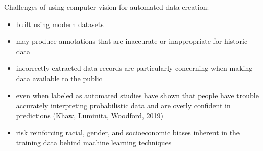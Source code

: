 \documentclass[12pt,ignorenonframetext,aspectratio=169]{beamer}
\begin{document}
\begin{frame}{}

Challenges of using computer vision for automated data creation:

\begin{itemize}
\item built using modern datasets \pause
\item may produce annotations that are inaccurate or inappropriate for historic data  \pause
\item incorrectly extracted data records are particularly concerning when making data
available to the public  \pause
\item even when labeled as automated studies have shown that people have trouble accurately
interpreting probabilistic data and are overly confident in predictions
(Khaw, Luminita, Woodford, 2019)  \pause
\item risk reinforcing racial, gender, and socioeconomic biases inherent in the training
data behind machine learning techniques
\end{itemize}

\end{frame}

\end{document}
